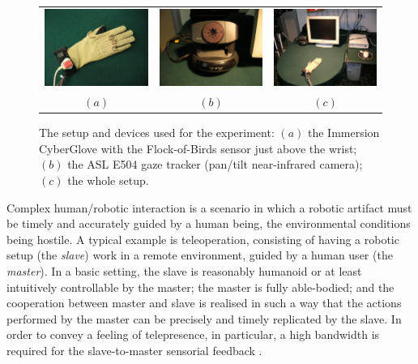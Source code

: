 \documentclass[a4paper,10pt,conference]{ieeeconf}
\begin{document}
\begin{figure}[ht]
  \centering
    \begin{tabular}{ccc}
      \includegraphics[width=0.31\linewidth]{glove.eps} &
      \includegraphics[width=0.31\linewidth]{e504.eps} &
      \includegraphics[width=0.31\linewidth]{setup.eps} \\
      $(a)$ & $(b)$ & $(c)$
    \end{tabular}
    \caption{The setup and devices used for the experiment: $(a)$ the
    Immersion CyberGlove with the Flock-of-Birds sensor just above the
    wrist; $(b)$ the ASL E504 gaze tracker (pan/tilt near-infrared
    camera); $(c)$ the whole setup.}
    \label{fig:devices}
\end{figure}

Complex human/robotic interaction is a scenario in which a robotic
artifact must be timely and accurately guided by a human being, the
environmental conditions being hostile. A typical example is
teleoperation, consisting of having a robotic setup (the \emph{slave})
work in a remote environment, guided by a human user (the
\emph{master}). In a basic setting, the slave is reasonably humanoid
or at least intuitively controllable by the master; the master is
fully able-bodied; and the cooperation between master and slave is
realised in such a way that the actions performed by the master can be
precisely and timely replicated by the slave. In order to convey a
feeling of telepresence, in particular, a high bandwidth is required
for the slave-to-master sensorial feedback \cite{telesensation}.
\end{document}
